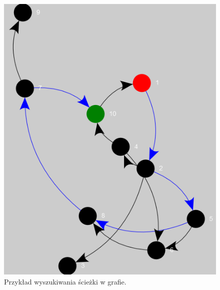 \begin{figure}[!h]
	\centering
	\includegraphics{img/planowanie}
	\caption{Przykład wyszukiwania ścieżki w grafie.}
	\label{fig:planowanie}
\end{figure}
